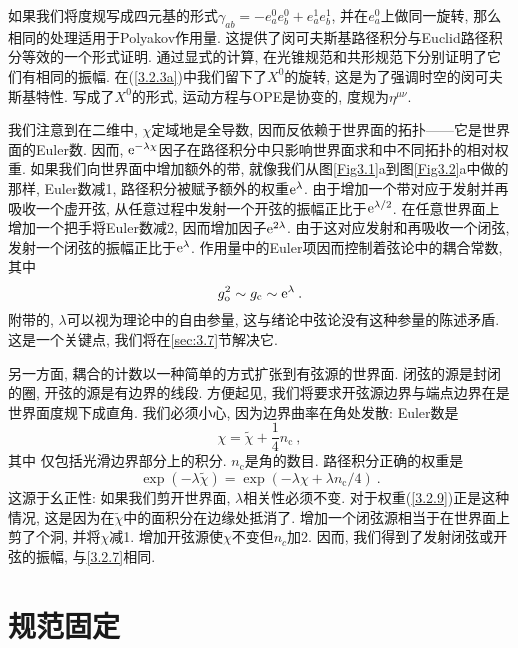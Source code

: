 如果我们将度规写成四元基的形式$\gamma_{a b}=-e_{a}^{0} e_{b}^{0}+e_{a}^{1} e_{b}^{1}$, 并在$e_a^0$上做同一旋转, 那么相同的处理适用于Polyakov作用量. 
这提供了闵可夫斯基路径积分与Euclid路径积分等效的一个形式证明. 通过显式的计算, 在光锥规范和共形规范下分别证明了它们有相同的振幅.
在(\ref{3.2.3a})中我们留下了$X^0$的旋转, 这是为了强调时空的闵可夫斯基特性. 写成了$X^0$的形式, 运动方程与OPE是协变的, 度规为$\eta^{\mu\nu}$. 

我们注意到在二维中, $\chi$定域地是全导数, 因而反依赖于世界面的拓扑——它是世界面的Euler数. 因而, $\mathrm{e}^{-\lambda \chi}$因子在路径积分中只影响世界面求和中不同拓扑的相对权重. 如果我们向世界面中增加额外的带, 就像我们从图\ref{Fig3.1}a到图\ref{Fig3.2}a中做的那样, Euler数减1, 路径积分被赋予额外的权重$\mathrm{e}^\lambda$. 由于增加一个带对应于发射并再吸收一个虚开弦, 从任意过程中发射一个开弦的振幅正比于$\mathrm{e}^{\lambda/2}$. 在任意世界面上增加一个把手将Euler数减2, 因而增加因子$\mathrm{e}^{2\lambda}$.  由于这对应发射和再吸收一个闭弦, 发射一个闭弦的振幅正比于$\mathrm{e}^\lambda$. 作用量中的Euler项因而控制着弦论中的耦合常数, 其中
\begin{equation}\label{3.2.7}
g_{\mathrm{o}}^{2} \sim g_{\mathrm{c}} \sim \mathrm{e}^{\lambda} \:.
\end{equation}
附带的, $\lambda$可以视为理论中的自由参量, 这与绪论中弦论没有这种参量的陈述矛盾. 这是一个关键点, 我们将在\ref{sec:3.7}节解决它.

另一方面, 耦合的计数以一种简单的方式扩张到有弦源的世界面. 闭弦的源是封闭的圈, 开弦的源是有边界的线段. 方便起见, 我们将要求开弦源边界与端点边界在是世界面度规下成直角. 我们必须小心, 因为边界曲率在角处发散: Euler数是
\begin{equation}
\chi=\tilde{\chi}+\frac{1}{4} n_{\mathrm{c}} \:, \label{3.2.8}
\end{equation}
其中 仅包括光滑边界部分上的积分. $n_\mathrm{c}$是角的数目. 路径积分正确的权重是
\begin{equation}\label{3.2.9}
\exp (-\lambda \tilde{\chi})=\exp (-\lambda \chi+\lambda n_{\mathrm{c}} / 4) \:. 
\end{equation}
这源于幺正性: 如果我们剪开世界面, $\lambda$相关性必须不变. 对于权重(\ref{3.2.9})正是这种情况,
这是因为在$\tilde{\chi}$中的面积分在边缘处抵消了. 增加一个闭弦源相当于在世界面上剪了个洞, 并将$\chi$减1. 
增加开弦源使$\chi$不变但$n_c$加2. 因而, 我们得到了发射闭弦或开弦的振幅, 与\eqref{3.2.7}相同. 

\section{\texorpdfstring{规范固定}{3.3 Gauge fixing}} \label{sec:3.3}

